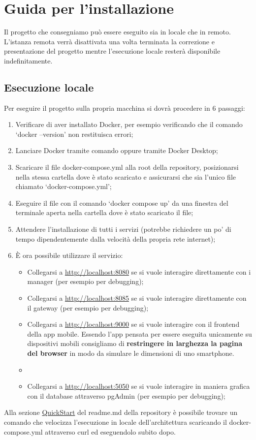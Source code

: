 \section{Guida per l'installazione}
Il progetto che consegniamo può essere eseguito sia in locale che in remoto. L'istanza remota verrà disattivata una volta terminata la correzione e presentazione del progetto mentre l'esecuzione locale resterà disponibile indefinitamente.
\subsection{Esecuzione locale}
Per eseguire il progetto sulla propria macchina si dovrà procedere in 6 passaggi:
\begin{enumerate}
  \item Verificare di aver installato Docker, per esempio verificando che il comando `docker --version' non restituisca errori;
  \item Lanciare Docker tramite comando oppure tramite Docker Desktop;
  \item Scaricare il file docker-compose.yml alla root della repository, posizionarsi nella stessa cartella dove è stato scaricato e assicurarsi che sia l'unico file chiamato `docker-compose.yml';
  \item Eseguire il file con il comando `docker compose up' da una finestra del terminale aperta nella cartella dove è stato scaricato il file;
  \item Attendere l'installazione di tutti i servizi (potrebbe richiedere un po' di tempo dipendentemente dalla velocità della propria rete internet);
  \item È ora possibile utilizzare il servizio:
  \begin{itemize}
    \item Collegarsi a \href{http://localhost:8080}{http://localhost:8080} se si vuole interagire direttamente con i manager (per esempio per debugging);
    \item Collegarsi a \href{http://localhost:8085}{http://localhost:8085} se si vuole interagire direttamente con il gateway (per esempio per debugging);
    \item Collegarsi a \href{http://localhost:9000}{http://localhost:9000} se si vuole interagire con il frontend della app mobile. Essendo l'app pensata per essere eseguita unicamente su dispositivi mobili consigliamo di \textbf{restringere in larghezza la pagina del browser} in modo da simulare le dimensioni di uno smartphone.
    \item     
    \item Collegarsi a \href{http://localhost:5050}{http://localhost:5050} se si vuole interagire in maniera grafica con il database attraverso pgAdmin (per esempio per debugging);
  \end{itemize}
\end{enumerate}
Alla sezione \href{https://github.com/FI-153/Progetto-PAC-2023-24/blob/main/README.md#quickstart}{QuickStart} del readme.md della repository è possibile trovare un comando che velocizza l'esecuzione in locale dell'architettura scaricando il docker-compose.yml attraverso curl ed eseguendolo subito dopo.

